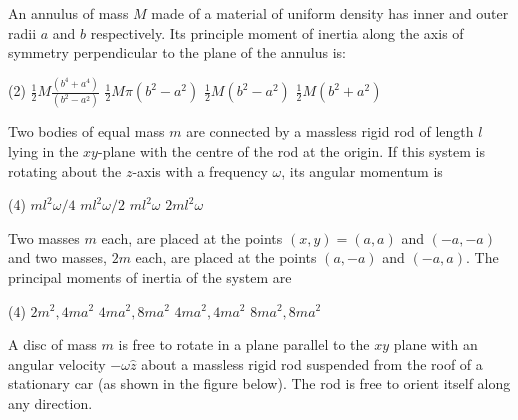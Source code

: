 \begin{enumerate}
\begin{minipage}{\textwidth}
	\item An annulus of mass $M$ made of a material of uniform density has inner and outer radii $a$ and $b$ respectively. Its principle moment of inertia along the axis of symmetry perpendicular to the plane of the annulus is:
\end{minipage}
\begin{tasks}(2)
	\task[\textbf{A.}] $\frac{1}{2} M \frac{\left(b^{4}+a^{4}\right)}{\left(b^{2}-a^{2}\right)}$
	\task[\textbf{B.}]$\frac{1}{2} M \pi\left(b^{2}-a^{2}\right)$
	\task[\textbf{C.}]$\frac{1}{2} M\left(b^{2}-a^{2}\right)$
	\task[\textbf{D.}]$\frac{1}{2} M\left(b^{2}+a^{2}\right)$
\end{tasks}
\begin{minipage}{\textwidth}
	\item Two bodies of equal mass $m$ are connected by a massless rigid rod of length $l$ lying in the $x y$-plane with the centre of the rod at the origin. If this system is rotating about the $z$-axis with a frequency $\omega$, its angular momentum is
\end{minipage}
\begin{tasks}(4)
	\task[\textbf{A.}] $m l^{2} \omega / 4$
	\task[\textbf{B.}]$m l^{2} \omega / 2$
	\task[\textbf{C.}]$m l^{2} \omega$
	\task[\textbf{D.}]$2 m l^{2} \omega$
\end{tasks}
\begin{minipage}{\textwidth}
	\item Two masses $m$ each, are placed at the points $(x, y)=(a, a)$ and $(-a,-a)$ and two masses, $2 m$ each, are placed at the points $(a,-a)$ and $(-a, a)$. The principal moments of inertia of the system are
\end{minipage}
\begin{tasks}(4)
	\task[\textbf{A.}] $2 m^{2}, 4 m a^{2}$
	\task[\textbf{B.}]$4 m a^{2}, 8 m a^{2}$
	\task[\textbf{C.}] $4 m a^{2}, 4 m a^{2}$
	\task[\textbf{D.}] $8 m a^{2}, 8 m a^{2}$
\end{tasks}
\begin{minipage}{\textwidth}
	\item A disc of mass $m$ is free to rotate in a plane parallel to the $x y$ plane with an angular velocity $-\omega \hat{z}$ about a massless rigid rod suspended from the roof of a stationary car (as shown in the figure below). The rod is free to orient itself along any direction.

\end{minipage}
\end{enumerate}
